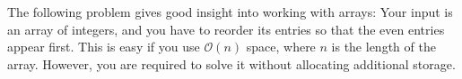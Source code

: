 \documentclass[10pt,openany,twoside,letterpaper,extrafontsizes]{memoir}
\begin{document}
\begin{Spacing}{\arraysSpacing}
The following problem gives good insight into working with arrays:
Your input is an array of integers, and you have to reorder its entries so that the even
entries appear first. This is easy if you use $\mathcal{O}(n)$ space, where $n$ is the length
of the array. However, you are required to solve it without allocating additional storage.


%


\end{Spacing}
\end{document}
